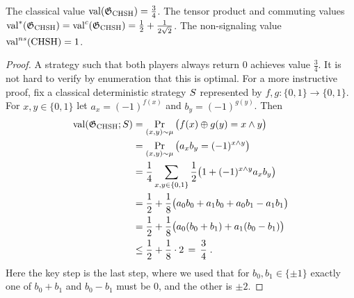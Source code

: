 \begin{lemma}\label{lemma-chsh-qval}
The classical value $\mathrm{val}(\mathfrak{G}_{\mathrm{CHSH}})=\frac{3}{4}$. The tensor product and commuting values $\mathrm{val}^*(\mathfrak{G}_{\mathrm{CHSH}})=\mathrm{val}^c(\mathfrak{G}_{\mathrm{CHSH}})= \frac{1}{2} + \frac{1}{2\sqrt{2}}$. The non-signaling value $\mathrm{val}^{ns}(\mathrm{CHSH})=1$. 
\end{lemma}

\begin{proof}
A strategy such that both players always return $0$ achieves value $\frac{3}{4}$. It is not hard to verify by enumeration that this is optimal. For a more instructive proof, fix a classical deterministic strategy ${S}$ represented by $f,g:\{0,1\}\to\{0,1\}$. For $x,y\in\{0,1\}$ let $a_x = (-1)^{f(x)}$ and $b_y = (-1)^{g(y)}$. Then 
\begin{align}
\mathrm{val}(\mathfrak{G}_{\mathrm{CHSH}};{S}) &= \Pr_{(x,y)\sim \mu} \big( f(x)\oplus g(y) = x\wedge y \big) \label{equation-chsh-qval1}\\
 &= \Pr_{(x,y)\sim \mu} \big( a_x b_y = (-1)^{x\wedge y} \big) \notag\\
&= \frac{1}{4}\sum_{x,y\in\{0,1\}}\frac{1}{2}\big(1 + (-1)^{x\wedge y} a_x b_y\big)\notag\\
&= \frac{1}{2} + \frac{1}{8}\big( a_0 b_0 + a_1 b_0 + a_0 b_1 - a_1 b_1 \big)\notag\\
 &= \frac{1}{2} + \frac{1}{8}\big( a_0 (b_0 + b_1) + a_1 (b_0 -  b_1) \big)\notag\\
&\leq \frac{1}{2} + \frac{1}{8} \cdot 2\,=\, \frac{3}{4}\;.\notag
\end{align}
Here the key step is the last step, where we used that for $b_0,b_1 \in \{\pm 1\}$ exactly one of $b_0+b_1$ and $b_0-b_1$ must be $0$, and the other is $\pm 2$. 


\end{proof}

